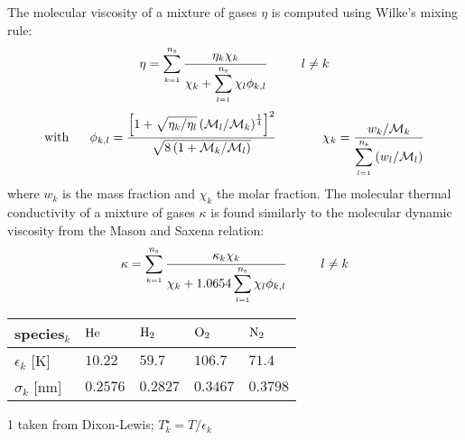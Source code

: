 \documentclass{warpdoc}
\newcommand{\ns}{{{n}_{\rm s}}}
\newcommand{\mfa}{\scriptscriptstyle}
\newcommand{\mfd}{\displaystyle}
\renewcommand{\fontsizetable}{\footnotesize\scalefont{1.0}}
\begin{document}
The molecular
viscosity of a mixture of gases $\eta$ is computed using Wilke's mixing rule:
%
\begin{equation}
\eta= \mfd\sum_{\mfa k=1}^{\ns}   \frac{\mfd \eta_k {\chi}_k}
                     {\mfd {\chi}_k +
                          \mfd\sum_{\mfa l=1}^{\ns}{\chi}_l \phi_{k,l}}
            ~~~~~~~~l \neq k
\label{eqn:molvisc-mixture}
\end{equation}
%
%
\begin{equation}
{\rm with~~~~~}\phi_{k,l}=\mfd \frac{ \left[  1 + \sqrt{ \mfd {\eta_k }/{\eta_l }}
                              \left( \mfd {{\cal M}_l}/{{\cal M}_k}  \right)^ \frac{1}{4}  \right]^2}
{ \sqrt{\mfd 8\left(1+\mfd {{\cal M}_k}/{{\cal M}_l}\right)}}
~~~~~~~~~~~
{\chi}_k= \mfd\frac{w_k / {\cal M}_k}
              {\mfd\sum_{\mfa l=1}^{\ns} \left( w_l / {\cal M}_l \right)}
\label{eqn:molvisc-phi}
\end{equation}
%
where $w_k$ is the mass fraction and $\chi_k$ the molar fraction. The molecular thermal conductivity of a mixture of gases
$\kappa$ is found similarly to the molecular dynamic
viscosity from the Mason and Saxena \cite{gen:mason-saxena} relation:
%
\begin{equation}
\kappa= \mfd\sum_{\mfa k=1}^{\ns}  \mfd \frac{\mfd\kappa_k \chi_k}
                     {\mfd \chi_k + \mfd 1.0654
                          \mfd\sum_{\mfa l=1}^{\ns}  {\chi}_l \phi_{k,l}}
            ~~~~~~~~l \neq k
\label{eqn:moltherm-mixture}
\end{equation}
%
%
\begin{table}[t]
\fontsizetable
\begin{center}
  \begin{threeparttable}
    \fontsizetable
    \begin{tabular}{lllll}
      \toprule
species$_k$     &  ${\rm He}$    &  ${\rm H}_2$   &  ${\rm O}_2$   &  ${\rm N}_2$  \\
\midrule
$\epsilon_k$ [K]&  $10.22$       &  $59.7$        &  $106.7$       &  $71.4$       \\
$\sigma_k$ [nm] &  $0.2576$      &  $0.2827$      &  $0.3467$      &  $0.3798$     \\
      \bottomrule
    \end{tabular}
    \label{table:species-epssig}
    \begin{tablenotes}
      \item [1] taken from Dixon-Lewis; $T^\star_k=T/ \epsilon_k$
    \end{tablenotes}
  \end{threeparttable}
\end{center}
\end{table}
\end{document}
